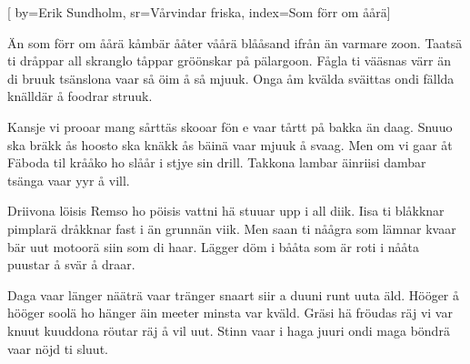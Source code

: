 
[
  by={Erik Sundholm},
  sr={Vårvindar friska},
  index={Som förr om åårä}]
  
\beginverse*
Än som förr om åårä
kåmbär ååter våårä
blååsand ifrån än varmare zoon.
Taatsä ti dråppar
all skranglo tåppar
gröönskar på pälargoon.
Fågla ti vääsnas värr än di bruuk
tsänslona vaar så öim å så mjuuk.
Onga åm kvälda
sväittas ondi fällda
knälldär å foodrar struuk.
\endverse

\beginverse*
Kansje vi prooar
mang sårttäs skooar
fön e vaar tårtt på bakka än daag.
Snuuo ska bräkk ås
hoosto ska knäkk ås
bäinä vaar mjuuk å svaag.
Men om vi gaar åt Fäboda til
krååko ho slåår i stjye sin drill.
Takkona lambar
äinriisi dambar
tsänga vaar yyr å vill.
\endverse

\beginverse*
Driivona löisis
Remso ho pöisis
vattni hä stuuar upp i all diik.
Iisa ti blåkknar
pimplarä dråkknar
fast i än grunnän viik.
\newpage
Men saan ti nåågra som lämnar kvaar
bär uut motoorä siin som di haar.
Lägger döm i bååta
som är roti i nååta
puustar å svär å draar.
\endverse

\beginverse*
Daga vaar länger
nääträ vaar tränger
snaart siir a duuni runt uuta äld.
Hööger å hööger
soolä ho hänger
äin meeter minsta var kväld.
Gräsi hä fröudas räj vi var knuut
kuuddona röutar räj å vil uut.
Stinn vaar i haga
juuri ondi maga
böndrä vaar nöjd ti sluut.
\endverse
\endsong